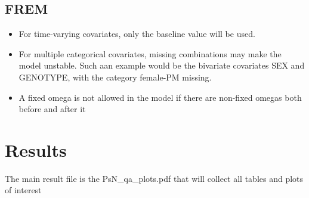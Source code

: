 \subsection{FREM}
\begin{itemize}
	\item For time-varying covariates, only the baseline value will be used.
	\item For multiple categorical covariates, missing combinations may make the model unstable. Such aan example would be the bivariate covariates SEX and GENOTYPE, with the category female-PM missing.
	\item A fixed omega is not allowed in the model if there are non-fixed omegas both before and after it
\end{itemize}


\section{Results}

The main result file is the PsN\_qa\_plots.pdf that will collect all tables and plots of interest



